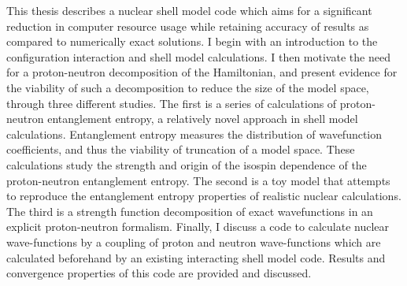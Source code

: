 



This thesis describes a nuclear shell model code which aims for a significant 
reduction in computer resource usage while 
retaining accuracy of results as compared to numerically exact solutions.
I begin with an introduction to the configuration interaction and shell
model calculations.
I then motivate the need for a proton-neutron decomposition of the Hamiltonian, and present
evidence for the viability of such a decomposition to reduce the size of the 
model space, through three different studies.  The first is a series of calculations of
proton-neutron entanglement entropy, a relatively novel approach in shell 
model calculations. Entanglement entropy measures the distribution
of wavefunction coefficients, and thus the viability of truncation
of a model space.
These calculations study the strength and origin of the 
isospin dependence of the proton-neutron entanglement entropy.
The second is a toy model that attempts to reproduce the entanglement entropy
properties of realistic nuclear calculations.
The third is a strength function decomposition of exact wavefunctions in 
an explicit proton-neutron formalism.
Finally, I discuss a code to calculate nuclear wave-functions by 
a coupling of proton and neutron wave-functions which are calculated beforehand 
by an existing interacting shell model code. 
Results and convergence properties of this code are provided and discussed.



